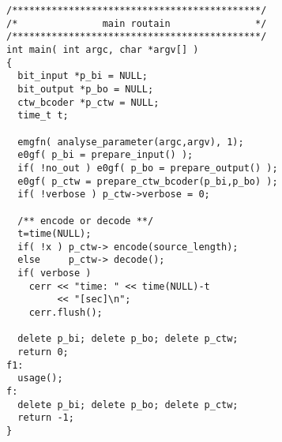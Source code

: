 \begin{verbatim}
/********************************************/
/*               main routain               */
/********************************************/
int main( int argc, char *argv[] )
{
  bit_input *p_bi = NULL;
  bit_output *p_bo = NULL;
  ctw_bcoder *p_ctw = NULL;
  time_t t;

  emgfn( analyse_parameter(argc,argv), 1);
  e0gf( p_bi = prepare_input() );
  if( !no_out ) e0gf( p_bo = prepare_output() );
  e0gf( p_ctw = prepare_ctw_bcoder(p_bi,p_bo) );
  if( !verbose ) p_ctw->verbose = 0;

  /** encode or decode **/
  t=time(NULL);
  if( !x ) p_ctw-> encode(source_length);
  else     p_ctw-> decode();
  if( verbose )
    cerr << "time: " << time(NULL)-t
         << "[sec]\n";
    cerr.flush();

  delete p_bi; delete p_bo; delete p_ctw;
  return 0;
f1:
  usage();
f:
  delete p_bi; delete p_bo; delete p_ctw;
  return -1;
}
\end{verbatim}
